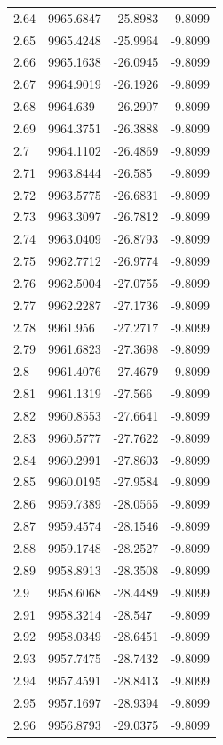 \begin{table}[H]
\begin{tabular}{llll}
2.64 & 9965.6847 & -25.8983 & -9.8099 \\
2.65 & 9965.4248 & -25.9964 & -9.8099 \\
2.66 & 9965.1638 & -26.0945 & -9.8099 \\
2.67 & 9964.9019 & -26.1926 & -9.8099 \\
2.68 & 9964.639 & -26.2907 & -9.8099 \\
2.69 & 9964.3751 & -26.3888 & -9.8099 \\
2.7 & 9964.1102 & -26.4869 & -9.8099 \\
2.71 & 9963.8444 & -26.585 & -9.8099 \\
2.72 & 9963.5775 & -26.6831 & -9.8099 \\
2.73 & 9963.3097 & -26.7812 & -9.8099 \\
2.74 & 9963.0409 & -26.8793 & -9.8099 \\
2.75 & 9962.7712 & -26.9774 & -9.8099 \\
2.76 & 9962.5004 & -27.0755 & -9.8099 \\
2.77 & 9962.2287 & -27.1736 & -9.8099 \\
2.78 & 9961.956 & -27.2717 & -9.8099 \\
2.79 & 9961.6823 & -27.3698 & -9.8099 \\
2.8 & 9961.4076 & -27.4679 & -9.8099 \\
2.81 & 9961.1319 & -27.566 & -9.8099 \\
2.82 & 9960.8553 & -27.6641 & -9.8099 \\
2.83 & 9960.5777 & -27.7622 & -9.8099 \\
2.84 & 9960.2991 & -27.8603 & -9.8099 \\
2.85 & 9960.0195 & -27.9584 & -9.8099 \\
2.86 & 9959.7389 & -28.0565 & -9.8099 \\
2.87 & 9959.4574 & -28.1546 & -9.8099 \\
2.88 & 9959.1748 & -28.2527 & -9.8099 \\
2.89 & 9958.8913 & -28.3508 & -9.8099 \\
2.9 & 9958.6068 & -28.4489 & -9.8099 \\
2.91 & 9958.3214 & -28.547 & -9.8099 \\
2.92 & 9958.0349 & -28.6451 & -9.8099 \\
2.93 & 9957.7475 & -28.7432 & -9.8099 \\
2.94 & 9957.4591 & -28.8413 & -9.8099 \\
2.95 & 9957.1697 & -28.9394 & -9.8099 \\
2.96 & 9956.8793 & -29.0375 & -9.8099 \\

\end{tabular}
\end{table}
